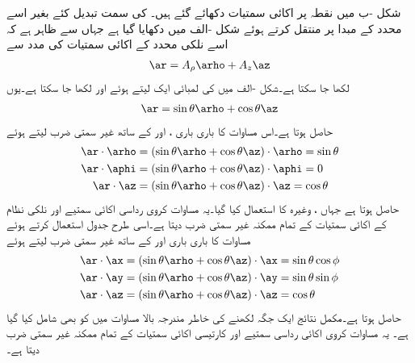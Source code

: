 شکل -ب میں نقطہ  پر اکائی سمتیات دکھائے گئے ہیں۔ کی سمت تبدیل کئے بغیر اسے محدد کے مبدا پر منتقل کرتے ہوئے شکل -الف  میں دکھایا گیا ہے جہاں سے ظاہر ہے کہ اسے نلکی محدد کے اکائی سمتیات کی مدد سے
\begin{align}
\ar=A_\rho \arho+A_z \az
\end{align}
لکھا جا سکتا ہے۔شکل -الف  میں  کی لمبائی ایک لیتے ہوئے   اور  لکھا جا سکتا ہے۔یوں
\begin{align}\label{مساوات_سمتیہ_کروی_اکائی_نلکی_منتقل}
\ar=\sin \theta \arho+\cos \theta \az
\end{align}
حاصل ہوتا ہے۔اس مساوات کا باری باری ،  اور  کے ساتھ غیر سمتی ضرب لیتے ہوئے
\begin{gather}
\begin{aligned}\label{مساوات_سمتیہ_کروی_رداس_نلکی_اکائی_غیر_سمتی_ضرب}
\ar \cdot \arho&=(\sin \theta \arho+\cos \theta \az) \cdot \arho=\sin \theta\\
\ar \cdot \aphi&=(\sin \theta \arho+\cos \theta \az) \cdot \aphi=0\\
\ar \cdot \az&=(\sin \theta \arho+\cos \theta \az) \cdot \az=\cos \theta
\end{aligned}
\end{gather}
حاصل ہوتا ہے جہاں ،  وغیرہ کا استعمال کیا گیا۔یہ مساوات کروی رداسی اکائی سمتیے اور نلکی نظام کے اکائی سمتیات کے تمام ممکنہ غیر سمتی ضرب دیتا ہے۔اسی طرح جدول  استعمال کرتے ہوئے  مساوات   کا باری باری  اور  کے ساتھ غیر سمتی ضرب لیتے ہوئے
\begin{gather}
\begin{aligned}\label{مساوات_سمتیہ_کروی_رداس_کے_کارتیسی_اجزاء}
\ar \cdot \ax&=(\sin \theta \arho+\cos \theta \az) \cdot \ax=\sin \theta \cos \phi\\
\ar \cdot \ay&=(\sin \theta \arho+\cos \theta \az) \cdot \ay=\sin \theta \sin \phi\\
\ar \cdot \az&=(\sin \theta \arho+\cos \theta \az) \cdot \az=\cos \theta
\end{aligned}
\end{gather}
حاصل ہوتا ہے۔مکمل نتائج ایک جگہ لکھنے کی خاطر  مندرجہ بالا مساوات میں   کو بھی شامل کیا گیا ہے۔ یہ مساوات کروی اکائی رداسی  سمتیے  اور کارتیسی اکائی سمتیات کے تمام ممکنہ غیر سمتی ضرب دیتا ہے۔

